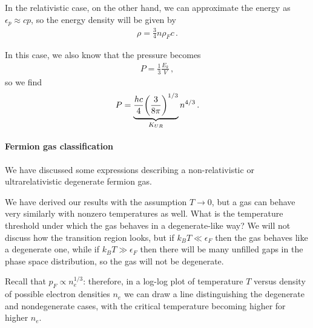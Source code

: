 \documentclass[main.tex]{subfiles}
\begin{document}
%

In the relativistic case, on the other hand, we can approximate the energy as \(\epsilon _p \approx cp\), so the energy density will be given by 
%
\begin{align}
\rho = \frac{3}{4} n \rho _F c
\,.
\end{align}

In this case, we also know that the pressure becomes 
%
\begin{align}
  P = \frac{1}{3} \frac{E_k}{V}
\,,
\end{align}
%
so we find 
%
\begin{align}
P = \underbrace{\frac{hc}{4} \qty(\frac{3}{8 \pi })^{1/3}}_{K_{UR}} n^{4/3} 
\,.
\end{align}

\paragraph{Fermion gas classification}

We have discussed some expressions describing a non-relativistic or ultrarelativistic degenerate fermion gas. 

We have derived our results with the assumption \(T \to 0\), but a gas can behave very similarly with nonzero temperatures as well. 
What is the temperature threshold under which the gas behaves in a degenerate-like way?
We will not discuss how the transition region looks, but if \(k_B T \ll \epsilon _F\) then the gas behaves like a degenerate one, while if \(k_B T \gg \epsilon _F\) then there will be many unfilled gaps in the phase space distribution, so the gas will not be degenerate. 

Recall that \(p_F \propto n_e^{1/3}\): therefore, in a log-log plot of temperature \(T\) versus density of possible electron densities \(n_e\) we can draw a line distinguishing the degenerate and nondegenerate cases, with the critical temperature becoming higher for higher \(n_e\).

\end{document}
